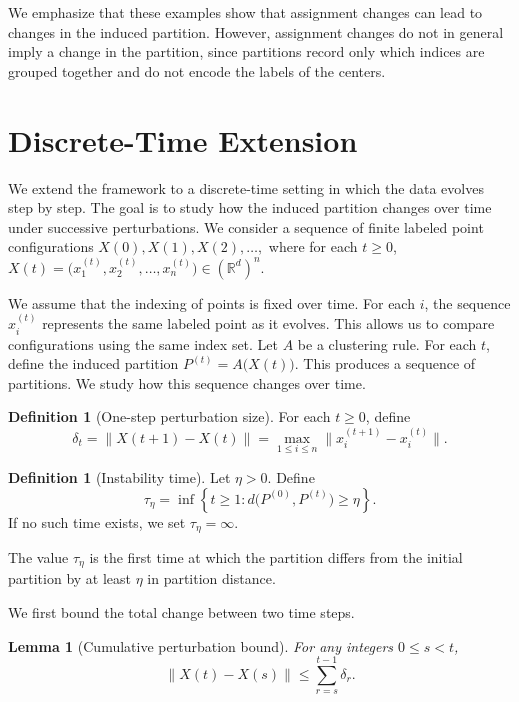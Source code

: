 \documentclass[11pt]{amsart}
\theoremstyle{plain}
\newtheorem{lemma}[subsection]{Lemma}
\theoremstyle{definition}
\newtheorem{definition}[subsection]{Definition}
\begin{document}
We emphasize that these examples show that assignment changes can lead to changes in the induced partition. However, assignment changes do not in general imply a change in the partition, since partitions record only which indices are grouped together and do not encode the labels of the centers.




\section{Discrete-Time Extension}

We extend the framework to a discrete-time setting in which the data evolves step by step. The goal is to study how the induced partition changes over time under successive perturbations. We consider a sequence of finite labeled point configurations
$X(0), X(1), X(2), \ldots,$
where for each $t \ge 0$,
$X(t) = \big(x^{(t)}_1, x^{(t)}_2, \ldots, x^{(t)}_n\big) \in (\mathbb{R}^d)^n.$

We assume that the indexing of points is fixed over time. For each $i$, the sequence $x^{(t)}_i$ represents the same labeled point as it evolves. This allows us to compare configurations using the same index set.
Let $A$ be a clustering rule. For each $t$, define the induced partition
$P^{(t)} = A\big(X(t)\big).$
This produces a sequence of partitions. We study how this sequence changes over time.

\begin{definition}[One-step perturbation size]
For each $t \ge 0$, define
\[
\delta_t = \|X(t+1) - X(t)\| = \max_{1 \le i \le n} \|x^{(t+1)}_i - x^{(t)}_i\|.
\]
\end{definition}

\begin{definition}[Instability time]
Let $\eta > 0$. Define
\[
\tau_\eta = \inf \left\{ t \ge 1 : d\big(P^{(0)}, P^{(t)}\big) \ge \eta \right\}.
\]
If no such time exists, we set $\tau_\eta = \infty$.
\end{definition}

The value $\tau_\eta$ is the first time at which the partition differs from the initial partition by at least $\eta$ in partition distance.

We first bound the total change between two time steps.

\begin{lemma}[Cumulative perturbation bound]
For any integers $0 \le s < t$,
\[
\|X(t) - X(s)\| \le \sum_{r=s}^{t-1} \delta_r.
\]
\end{lemma}
\end{document}
